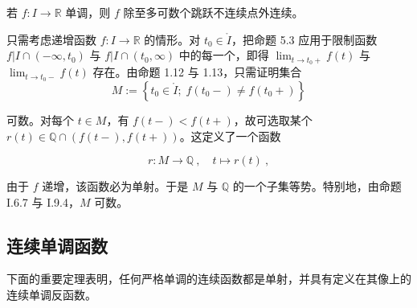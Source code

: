 \begin{proposition}

若 $ f: I \to \mathbb{R} $ 单调，则 $ f $ 除至多可数个跳跃不连续点外连续。

\proofhead
只需考虑递增函数 $f: I \to \mathbb{R}$ 的情形。对 $t_0 \in \mathring{I}$，把命题 5.3 应用于限制函数 $f|I \cap (-\infty, t_0)$ 与 $f|I \cap (t_0, \infty)$ 中的每一个，即得 $\lim_{t \to t_0+} f(t)$ 与 $\lim_{t \to t_0-} f(t)$ 存在。由命题 1.12 与 1.13，只需证明集合
\[
M:=\left\{t_{0}\in\mathring{I};\;f(t_{0}-)\neq f(t_{0}+)\right\}
\]

可数。对每个 $t \in M$，有 $f(t-) < f(t+)$，故可选取某个 $r(t) \in \mathbb{Q} \cap (f(t-), f(t+))$。这定义了一个函数

\[
r\colon M\to\mathbb{Q}~,\quad t\mapsto r(t)~,
\]

由于 $f$ 递增，该函数必为单射。于是 $M$ 与 $\mathbb{Q}$ 的一个子集等势。特别地，由命题 I.6.7 与 I.9.4，$M$ 可数。

\end{proposition}

\subsection*{连续单调函数}

下面的重要定理表明，任何严格单调的连续函数都是单射，并具有定义在其像上的连续单调反函数。

